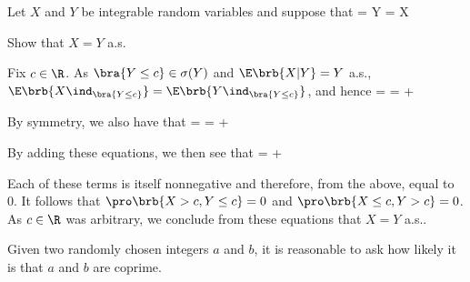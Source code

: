 \begin{problem}
Let $X$ and $Y$ be integrable random variables and suppose that
\be
\E{} = Y\quad {}\quad \E{} = X\ 
\ee

Show that $X = Y$ a.s.
\end{problem}%

\begin{solution}[\bf Solution.]
Fix $c \in \R$. As $\bra{Y \leq  c} \in \sigma(Y)$ and $\E\brb{X|Y} = Y$ a.s., $\E\brb{X\ind_{\bra{Y\leq c}}} = \E\brb{Y\ind_{\bra{Y\leq c}}}$, and hence
 = \E{} = \E{}+\E{}
\ee

By symmetry, we also have that
 = \E{} = \E{}+\E{}
\ee

By adding these equations, we then see that
 = \E{} + \E{}
\ee

Each of these terms is itself nonnegative and therefore, from the above, equal to 0. It follows that $\pro\brb{X > c,Y \leq  c} = 0$ and $\pro\brb{X \leq  c,Y > c} = 0$. As $c \in \R$ was arbitrary, we conclude from these equations that $X =Y$ a.s..
\end{solution}

\begin{problem}
Given two randomly chosen integers $a$ and $b$, it is reasonable to ask how likely it is that $a$ and $b$ are coprime.
\end{problem}

